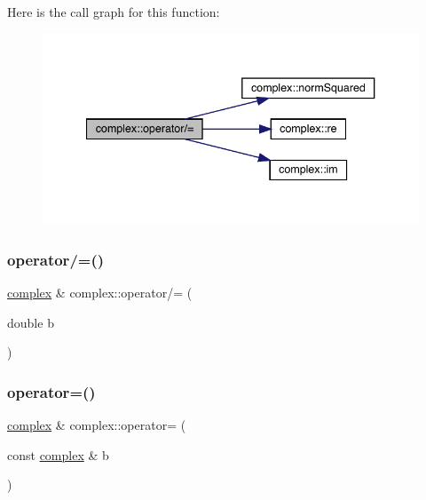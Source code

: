 Here is the call graph for this function\+:
\nopagebreak
\begin{figure}[H]
\begin{center}
\leavevmode
\includegraphics[width=340pt]{classcomplex_a2f33210a2ac9f91ad3f1f94958c52ee9_cgraph}
\end{center}
\end{figure}
\mbox{\label{classcomplex_ae519ff68a81b3c9944a3e3ec60bbe80f}} 
\subsubsection{\texorpdfstring{operator/=()}{operator/=()}\hspace{0.1cm}{\footnotesize\ttfamily [2/2]}}
{\footnotesize\ttfamily \mbox{\hyperlink{classcomplex}{complex}} \& complex\+::operator/= (\begin{DoxyParamCaption}\item[{double}]{b }\end{DoxyParamCaption})}

\mbox{\label{classcomplex_a83c122535af669e7f331d71de550e9ba}} 
\subsubsection{\texorpdfstring{operator=()}{operator=()}}
{\footnotesize\ttfamily \mbox{\hyperlink{classcomplex}{complex}} \& complex\+::operator= (\begin{DoxyParamCaption}\item[{const \mbox{\hyperlink{classcomplex}{complex}} \&}]{b }\end{DoxyParamCaption})}

